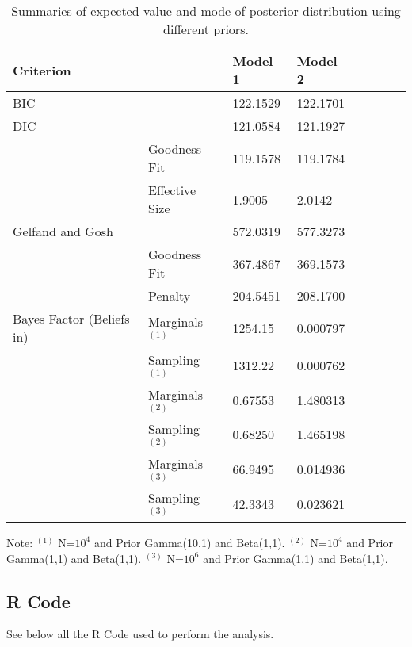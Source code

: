 \documentclass[a4paper, 11pt]{article}
\begin{document}
\begin{table}[H]
\caption{Summaries of expected value and mode of posterior distribution using different priors.}\label{criter}
\centering
\begin{tabular}{llllllcc}
\hline
Criterion & & Model 1 & Model 2 \\
\hline
BIC & &  122.1529 &  122.1701  \\

DIC & & 121.0584 & 121.1927 \\
& Goodness Fit & 119.1578 &  119.1784  \\
& Effective Size  & 1.9005 & 2.0142 \\

Gelfand and Gosh & & 572.0319 &  577.3273\\
& Goodness Fit & 367.4867 & 369.1573  \\
& Penalty  & 204.5451 & 208.1700 \\

Bayes Factor (Beliefs in) & Marginals$^{(1)}$ & 1254.15  & 0.000797 \\
& Sampling$^{(1)}$  & 1312.22 & 0.000762 \\
& Marginals$^{(2)}$ & 0.67553  & 1.480313  \\
& Sampling$^{(2)}$  & 0.68250  & 1.465198 \\
& Marginals$^{(3)}$ & 66.9495 & 0.014936 \\
& Sampling$^{(3)}$  & 42.3343  & 0.023621 \\
\hline
\end{tabular}
\end{table}
\noindent
Note: $^{(1)}$ N=$10^4$ and Prior Gamma(10,1) and Beta(1,1).  $^{(2)}$ N=$10^4$ and Prior Gamma(1,1) and Beta(1,1). $^{(3)}$ N=$10^6$ and Prior Gamma(1,1) and Beta(1,1). 

\newpage
\subsection*{R Code}\label{code}

See below all the R Code used to perform the analysis.
\end{document}
